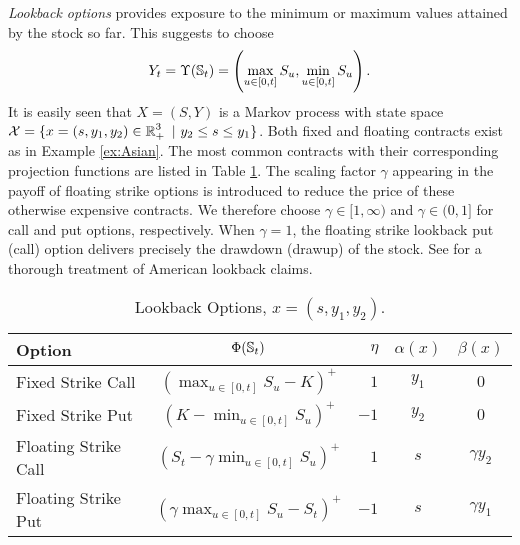 \begin{example}\label{ex:lookback}
\textit{Lookback options} 
provides exposure to the minimum or maximum values attained by the stock so far. This suggests to choose $$Y_t=\Upsilon(\operatorname{\mathbb{S}}_t) = \left(\max_{u\in[0,t]} S_u,\min_{u\in[0,t]} S_u\right).$$
It is easily seen that $X=(S,Y)$ is a  Markov process with state space $\operatorname{\mathcal{X}} = \{x=(s,y_1,y_2) \in \operatorname{\mathbb{R}}_+^3 \ | \ y_2 \le s \le y_1\}$. Both fixed and floating contracts exist as in Example \ref{ex:Asian}. The most common contracts with their corresponding projection functions are listed in Table \ref{tab:lkbk}. The scaling factor $\gamma$ appearing in the payoff of floating strike options is introduced to reduce the price of these otherwise expensive contracts. We therefore choose $\gamma \in [1,\infty)$ and $\gamma \in (0,1]$ for call and put options, respectively.  
When $\gamma=1$, the floating strike lookback put (call) option delivers precisely the
drawdown (drawup) of the stock. See \citet{DaiKwok} for a thorough treatment of American lookback claims.  

\begin{table}[H]
    \centering
    \caption{Lookback Options, $x=(s,y_1,y_2)$.}
    \begin{tabular}{lcrcc}
    \hline \hline
        Option & $\Phi(\operatorname{\mathbb{S}}_t)$ & $\eta$ & $\alpha(x)$ & $\beta(x)$ \\ \hline \hline
         Fixed Strike Call & $(\max_{u\in[0,t]} S_u - K)^{+} $ & $1$ & $y_1$ & $0$ \\[0.5em] %
       Fixed Strike Put & $(K - \min_{u\in[0,t]}S_u )^{+} $ & $-1$ & $y_2$ & $0$ \\[0.5em] %
        Floating Strike Call & $(S_t - \gamma\min_{u\in[0,t]} S_u)^+$  & $1$ & $s$ & $\gamma  y_2$ \\[0.5em] %
        Floating Strike Put & $(\gamma\max_{u\in[0,t]} S_u - S_t)^+$ & $-1$ & $s$ &  $\gamma y_1$ \\[0.3em] \hline 
    \end{tabular}
    
    \label{tab:lkbk}
\end{table}

\end{example}


